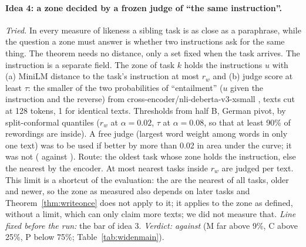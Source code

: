 \paragraph{Idea 4: a zone decided by a frozen judge of ``the same instruction''.} \emph{Tried.} In every measure of likeness a sibling task is as close as a paraphrase, while the question a zone must answer is whether two instructions ask for the same thing. The theorem needs no distance, only a set fixed when the task arrives. The instruction is a separate field. The zone of task $k$ holds the instructions $u$ with (a) MiniLM distance to the task's instruction at most $r_w$ and (b) judge score at least $\tau$: the smaller of the two probabilities of ``entailment'' ($u$ given the instruction and the reverse) from cross-encoder/nli-deberta-v3-xsmall \citep{he2023debertav3}, texts cut at 128 tokens, 1 for identical texts. Thresholds from half B, German pivot, by split-conformal quantiles ($r_w$ at $\alpha = 0.02$, $\tau$ at $\alpha = 0.08$, so that at least 90\% of rewordings are inside). A free judge (largest word weight among words in only one text) was to be used if better by more than 0.02 in area under the curve; it was not (\WidenJudgeAucFree{} against \WidenJudgeAucNli{}). Route: the oldest task whose zone holds the instruction, else the nearest by the encoder. At most \WidenJudgeLimit{} nearest tasks inside $r_w$ are judged per text. This limit is a shortcut of the evaluation: the \WidenJudgeLimit{} are the nearest of all \WidenTasksEval{} tasks, older and newer, so the zone as measured also depends on later tasks and Theorem~\ref{thm:writeonce} does not apply to it; it applies to the zone as defined, without a limit, which can only claim more texts; we did not measure that.
\emph{Line fixed before the run:} the bar of idea 3. \emph{Verdict: against} (\textsf{M} far above 9\%, \textsf{C} above 25\%, \textsf{P} below 75\%; Table~\ref{tab:widenmain}).
